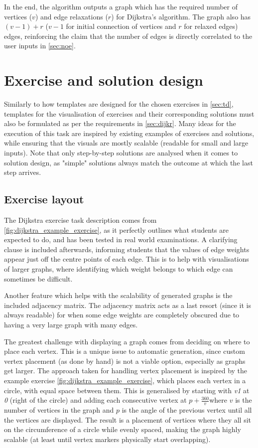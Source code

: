 \documentclass{l4proj}
\begin{document}
In the end, the algorithm outputs a graph which has the required number of vertices ($v$) and edge relaxations ($r$) for Dijkstra's algorithm. The graph also has $(v-1) + r$ ($v-1$ for initial connection of vertices and $r$ for relaxed edges) edges, reinforcing the claim that the number of edges is directly correlated to the user inputs in \autoref{sec:noe}.

\section{Exercise and solution design}


Similarly to how templates are designed for the chosen exercises in \autoref{sec:td}, templates for the visualisation of exercises and their corresponding solutions must also be formulated as per the requirements in \autoref{sec:dijkr}. Many ideas for the execution of this task are inspired by existing examples of exercises and solutions, while ensuring that the visuals are mostly scalable (readable for small and large inputs). Note that only step-by-step solutions are analysed when it comes to solution design, as "simple" solutions always match the outcome at which the last step arrives.

\subsection{Exercise layout}
\label{sec:dijkstraExerciseDesign}

The Dijkstra exercise task description comes from \autoref{fig:dijkstra_example_exercise}, as it perfectly outlines what students are expected to do, and has been tested in real world examinations. A clarifying clause is included afterwards, informing students that the values of edge weights appear just off the centre points of each edge. This is to help with visualisations of larger graphs, where identifying which weight belongs to which edge can sometimes be difficult.

Another feature which helps with the scalability of generated graphs is the included adjacency matrix. The adjacency matrix acts as a last resort (since it is always readable) for when some edge weights are completely obscured due to having a very large graph with many edges. 

The greatest challenge with displaying a graph comes from deciding on where to place each vertex. This is a unique issue to automatic generation, since custom vertex placement (as done by hand) is not a viable option, especially as graphs get larger. The approach taken for handling vertex placement is inspired by the example exercise  \autoref{fig:dijkstra_example_exercise}, which places each vertex in a circle, with equal space between them. This is generalised by starting with \emph{v1} at \emph{0 \textdegree} (right of the circle) and adding each consecutive vertex at $p+\frac{360 }{v}$\textdegree where $v$ is the number of vertices in the graph and $p$ is the angle of the previous vertex until all the vertices are displayed. The result is a placement of vertices where they all sit on the circumference of a circle while evenly spaced, making the graph highly scalable (at least until vertex markers physically start overlapping).
\end{document}
